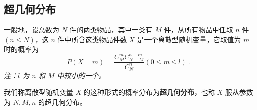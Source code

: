 \subsection{超几何分布}
一般地，设总数为 $N$ 件的两类物品，其中一类有 $M$ 件，从所有物品中任取 $n$ 件 $(n\leqslant N)$，这 $n$ 件中所含这类物品件数 $X$ 是一个离散型随机变量，它取值为 $m$ 时的概率为
\begin{equation}
P(X=m) = \frac{C_M^mC_{N-M}^{n-m}}{C_N^n}(0\leqslant m\leqslant l)~.
\end{equation}
\textsl{注：$l$ 为 $n$ 和 $M$ 中较小的一个。}

我们称离散型随机变量 $X$ 的这种形式的概率分布为\textbf{超几何分布}，也称 $X$ 服从参数为 $N,M,n$ 的超几何分布。
